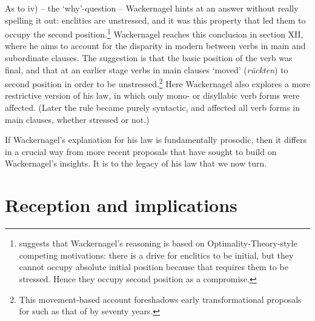 As to iv) -- the `why'-question -- Wackernagel hints at an answer without really spelling it out: enclitics are unstressed, and it was this property that led them to occupy the second position.\footnote{\citet[294--295]{Hale2017} suggests that Wackernagel's reasoning is based on Optimality-Theory-style competing motivations: there is a drive for enclitics to be initial, but they cannot occupy absolute initial position because that requires them to be stressed. Hence they occupy second position as a compromise.} Wackernagel reaches this conclusion in section XII, where he aims to account for the disparity in modern  between verbs in main and subordinate clauses. The suggestion is that the basic position of the verb was final, and that at an earlier stage verbs in main clauses `moved' (\textit{rückten}) to second position in order to be unstressed.\footnote{This movement-based account foreshadows early transformational proposals for  such as that of \citet{Bach1962} by seventy years.} Here Wackernagel also explores a more restrictive version of his law, in which only mono- or disyllabic verb forms were affected. (Later the rule became purely syntactic, and affected all verb forms in main clauses, whether stressed or not.)

If Wackernagel's explanation for his law is fundamentally prosodic, then it differs in a crucial way from more recent proposals that have sought to build on Wackernagel's insights. It is to the legacy of his law that we now turn.

\section{Reception and implications}\label{reception-implications}

